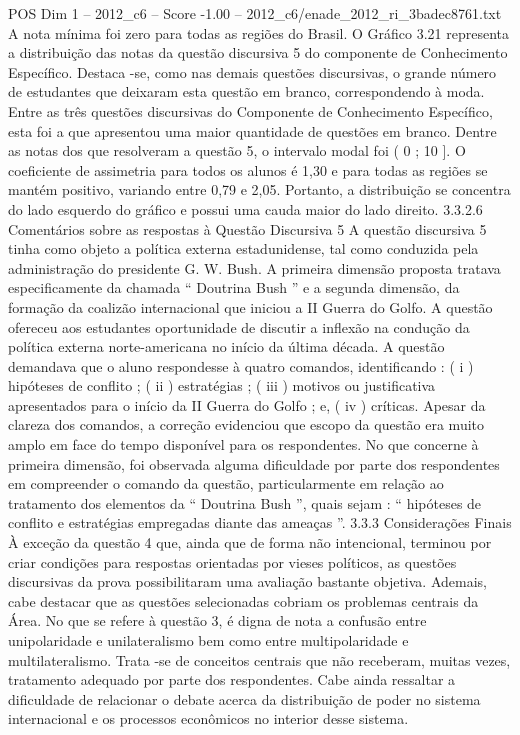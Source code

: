 \begin{textsample}{POS Dim 1 – 2012\_c6 – Score -1.00 – 2012\_c6/enade\_2012\_ri\_3badec8761.txt}
A nota mínima foi zero para todas as regiões do Brasil.
O Gráfico 3.21 representa a distribuição das notas da questão discursiva 5 do componente de Conhecimento Específico.
Destaca -se, como nas demais questões discursivas, o grande número de estudantes que deixaram esta questão em branco, correspondendo à moda.
Entre as três questões discursivas do Componente de Conhecimento Específico, esta foi a que apresentou uma maior quantidade de questões em branco.
Dentre as notas dos que resolveram a questão 5, o intervalo modal foi ( 0 ; 10 ].
O coeficiente de assimetria para todos os alunos é 1,30 e para todas as regiões se mantém positivo, variando entre 0,79 e 2,05.
Portanto, a distribuição se concentra do lado esquerdo do gráfico e possui uma cauda maior do lado direito. 3.3.2.6 Comentários sobre as respostas à Questão Discursiva 5 A questão discursiva 5 tinha como objeto a política externa estadunidense, tal como conduzida pela administração do presidente G.
W.
Bush.
A primeira dimensão proposta tratava especificamente da chamada “ Doutrina Bush ” e a segunda dimensão, da formação da coalizão internacional que iniciou a II Guerra do Golfo.
A questão ofereceu aos estudantes oportunidade de discutir a inflexão na condução da política externa norte-americana no início da última década.
A questão demandava que o aluno respondesse à quatro comandos, identificando : ( i ) hipóteses de conflito ; ( ii ) estratégias ; ( iii ) motivos ou justificativa apresentados para o início da II Guerra do Golfo ; e, ( iv ) críticas.
Apesar da clareza dos comandos, a correção evidenciou que escopo da questão era muito amplo em face do tempo disponível para os respondentes.
No que concerne à primeira dimensão, foi observada alguma dificuldade por parte dos respondentes em compreender o comando da questão, particularmente em relação ao tratamento dos elementos da “ Doutrina Bush ”, quais sejam : “ hipóteses de conflito e estratégias empregadas diante das ameaças ”. 3.3.3 Considerações Finais À exceção da questão 4 que, ainda que de forma não intencional, terminou por criar condições para respostas orientadas por vieses políticos, as questões discursivas da prova possibilitaram uma avaliação bastante objetiva.
Ademais, cabe destacar que as questões selecionadas cobriam os problemas centrais da Área.
No que se refere à questão 3, é digna de nota a confusão entre unipolaridade e unilateralismo bem como entre multipolaridade e multilateralismo.
Trata -se de conceitos centrais que não receberam, muitas vezes, tratamento adequado por parte dos respondentes.
Cabe ainda ressaltar a dificuldade de relacionar o debate acerca da distribuição de poder no sistema internacional e os processos econômicos no interior desse sistema.

\end{textsample}
